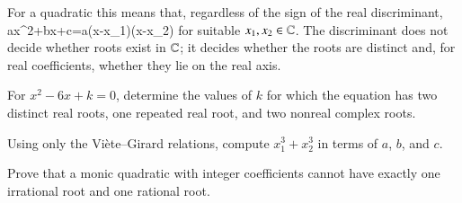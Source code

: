For a quadratic this means that, regardless of the sign of the real discriminant,
\be
ax^2+bx+c=a(x-x_1)(x-x_2)
\ee
for suitable $x_1,x_2\in\mathbb{C}$. The discriminant does not decide whether roots exist in $\mathbb{C}$; it decides whether the roots are distinct and, for real coefficients, whether they lie on the real axis.

\begin{exercise}
For $x^2-6x+k=0$, determine the values of $k$ for which the equation has two distinct real roots, one repeated real root, and two nonreal complex roots.
\end{exercise}

\begin{exercise}
Using only the Vi\`ete--Girard relations, compute $x_1^3+x_2^3$ in terms of $a$, $b$, and $c$.
\end{exercise}

\begin{exercise}
Prove that a monic quadratic with integer coefficients cannot have exactly one irrational root and one rational root.
\end{exercise}

